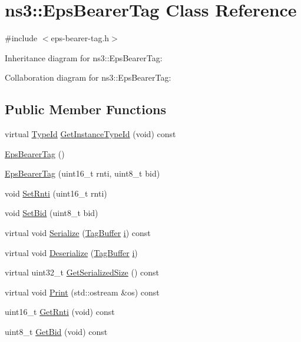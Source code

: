 \hypertarget{classns3_1_1EpsBearerTag}{}\section{ns3\+:\+:Eps\+Bearer\+Tag Class Reference}
\label{classns3_1_1EpsBearerTag}


{\ttfamily \#include $<$eps-\/bearer-\/tag.\+h$>$}



Inheritance diagram for ns3\+:\+:Eps\+Bearer\+Tag\+:


Collaboration diagram for ns3\+:\+:Eps\+Bearer\+Tag\+:
\subsection*{Public Member Functions}
\begin{DoxyCompactItemize}
\item 
virtual \hyperlink{classns3_1_1TypeId}{Type\+Id} \hyperlink{classns3_1_1EpsBearerTag_a15bc61fde53f5ff190a742c2a4b7bdca}{Get\+Instance\+Type\+Id} (void) const 
\item 
\hyperlink{classns3_1_1EpsBearerTag_ae08784b82261c65bb660fcd2f2ddb4fa}{Eps\+Bearer\+Tag} ()
\item 
\hyperlink{classns3_1_1EpsBearerTag_a7fa7060e41b56c11ca02683c413e5367}{Eps\+Bearer\+Tag} (uint16\+\_\+t rnti, uint8\+\_\+t bid)
\item 
void \hyperlink{classns3_1_1EpsBearerTag_ab19a2d8f86521b5edb80d71d85c7dc91}{Set\+Rnti} (uint16\+\_\+t rnti)
\item 
void \hyperlink{classns3_1_1EpsBearerTag_ad317904359f27a2d282a04945cbd78cf}{Set\+Bid} (uint8\+\_\+t bid)
\item 
virtual void \hyperlink{classns3_1_1EpsBearerTag_afd52b31db79d60373004dc904fdf7b5e}{Serialize} (\hyperlink{classns3_1_1TagBuffer}{Tag\+Buffer} \hyperlink{lte__uplink__power__control_8m_a6f6ccfcf58b31cb6412107d9d5281426}{i}) const 
\item 
virtual void \hyperlink{classns3_1_1EpsBearerTag_a209325ccee104db41fd0aefa3940026e}{Deserialize} (\hyperlink{classns3_1_1TagBuffer}{Tag\+Buffer} \hyperlink{lte__uplink__power__control_8m_a6f6ccfcf58b31cb6412107d9d5281426}{i})
\item 
virtual uint32\+\_\+t \hyperlink{classns3_1_1EpsBearerTag_a9c78f9131a919d3403b92be4439d39d6}{Get\+Serialized\+Size} () const 
\item 
virtual void \hyperlink{classns3_1_1EpsBearerTag_ac34c7f7a3af460842ea902e140a7ab4c}{Print} (std\+::ostream \&os) const 
\item 
uint16\+\_\+t \hyperlink{classns3_1_1EpsBearerTag_a0332943f030986306d2df8ae5b9b5f13}{Get\+Rnti} (void) const 
\item 
uint8\+\_\+t \hyperlink{classns3_1_1EpsBearerTag_ac3ef5843ed9842d5251fe6da93a26c3c}{Get\+Bid} (void) const 
\end{DoxyCompactItemize}
